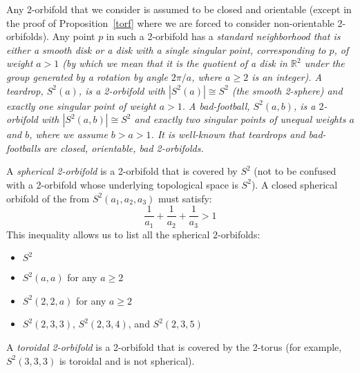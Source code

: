 \documentclass[12pt,reqno]{amsart}
\theoremstyle{plain}
\theoremstyle{definition}
\numberwithin{subcase}{case}
\theoremstyle{plain}
\theoremstyle{definition}
\begin{document}
\medskip

Any 2-orbifold that we consider is assumed to be closed and orientable (except in the proof of Proposition~\ref{torf} where we are forced to consider non-orientable 2-orbifolds).
Any point \(p\) in such a 2-orbifold has a \em standard neighborhood \em  that is either a smooth disk or a disk with a single singular point, corresponding to \(p\), of weight \(a>1\) (by which we mean that it is the quotient of a disk in \(\mathbb{R}^{2}\) under the group generated by a rotation by angle \(2\pi/a\), where \(a \geq 2\) is an integer).   A teardrop, $S^2(a)$, is a 2-orbifold with $|S^2(a)| \cong S^2$ (the smooth 2-sphere) and exactly one singular point of weight $a>1$. A bad-football, $S^2(a,b)$, is a \(2\)-orbifold with $|S^2(a,b)| \cong S^2$ and exactly two singular points of unequal weights $a$ and $b$, where  we assume $b>a>1$.  It is well-known that teardrops and bad-footballs are closed, orientable, bad 2-orbifolds.  

A \textit{spherical 2-orbifold} is a 2-orbifold that is covered by $S^2$ (not to be confused with a 2-orbifold whose underlying topological space is \(S^{2}\)).  
A closed spherical orbifold of the from \(S^{2}(a_{1},a_{2},a_{3})\) must satisfy:
\[
\frac{1}{a_{1}} + \frac{1}{a_{2}} + \frac{1}{a_{3}} > 1
\] 
This inequality allows us to list all the spherical \(2\)-orbifolds:\label{2orbifolds}
	\begin{itemize}
	\item \(S^{2}\)
	\item \(S^{2}(a,a)\) for any \(a \geq 2\)
	\item \(S^{2}(2,2,a)\) for any \(a \geq 2\)
	\item \(S^{2}(2,3,3)\),  \(S^{2}(2,3,4)\), and \(S^{2}(2,3,5)\)
	\end{itemize}

A \textit{toroidal 2-orbifold} is a 2-orbifold that is covered by the 2-torus  (for example, \(S^{2}(3,3,3)\) is toroidal and is not spherical).  

\medskip
\end{document}
